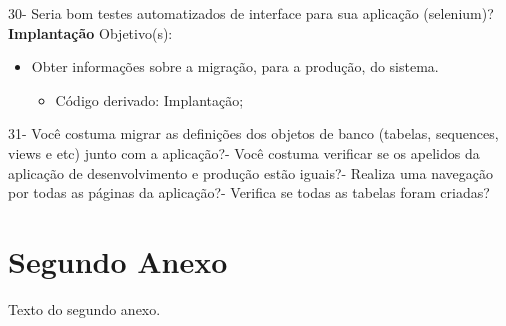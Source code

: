 \begin{anexosenv}
    30- Seria bom testes automatizados de interface para sua aplicação (selenium)?\newline
\newline
\textbf{Implantação}\newline\newline
Objetivo(s):
\begin{itemize}
\item Obter informações sobre a migração, para a produção, do sistema.
\begin{itemize}
\item Código derivado: Implantação;
\end{itemize}
\end{itemize}
    31- Você costuma migrar as definições dos objetos de banco (tabelas, sequences, views e etc) junto com a aplicação?- Você costuma verificar se os apelidos da aplicação de desenvolvimento e produção estão iguais?- Realiza uma navegação por todas as páginas da aplicação?- Verifica se todas as tabelas foram criadas?\newline
\newline
\chapter{Segundo Anexo}

Texto do segundo anexo.

\end{anexosenv}

